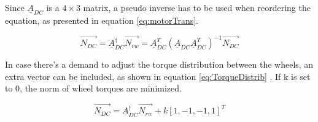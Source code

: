 Since $\underline{A}_{DC} $ is a $ 4 \times 3 $ matrix, a pseudo inverse has to be used when reordering the equation, as presented in equation \ref{eq:motorTrans}. 

\begin{equation}
\label{eq:motorTrans}
\vec{N_{DC}} =  \underline{A}_{DC} ^\dagger \vec{N_{rw}}   =  \underline{A}_{DC}^T  (\underline{A}_{DC} \underline{A}_{DC} ^T)^{-1} \vec{N_{DC}}
\end{equation}



In case there's a demand to adjust the torque distribution between the wheels, an extra vector can be included, as shown in equation \ref{eq:TorqueDistrib}
\cite[equation 18.41-42]{SADC}. If k is set to 0, the norm of wheel torques are minimized.

\begin{equation}
\label{eq:TorqueDistrib}
 \vec{N_{DC}} = \underline{A}^\dagger_{DC} \vec{N_{rw}}  + k\left[1,-1,-1,1\right]^T
\end{equation}

